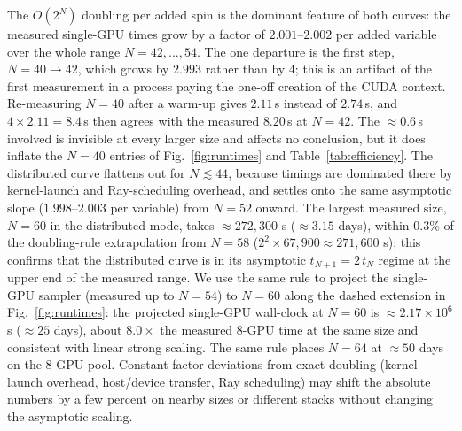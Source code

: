 \documentclass[12pt,a4paper]{elsarticle}
\begin{document}
The $O(2^N)$ doubling per added spin is the dominant feature of both curves: the
measured single-GPU times grow by a factor of $2.001$--$2.002$ per added variable
over the whole range $N=42,\dots,54$. The one departure is the first step,
$N=40\to42$, which grows by $2.993$ rather than by $4$; this is an artifact of the
first measurement in a process paying the one-off creation of the CUDA context.
Re-measuring $N=40$ after a warm-up gives $2.11$\,s instead of $2.74$\,s, and
$4\times 2.11=8.4$\,s then agrees with the measured $8.20$\,s at $N=42$. The
$\approx\!0.6$\,s involved is invisible at every larger size and affects no
conclusion, but it does inflate the $N=40$ entries of Fig.~\ref{fig:runtimes} and
Table~\ref{tab:efficiency}. The distributed curve flattens out for $N \lesssim 44$,
because timings are dominated there by kernel-launch and Ray-scheduling overhead,
and settles onto the same asymptotic slope ($1.998$--$2.003$ per variable) from
$N=52$ onward. The largest measured size, $N=60$ in the distributed mode, takes
$\approx\!272{,}300$ s ($\approx 3.15$ days), within $0.3\%$ of the
doubling-rule extrapolation from $N=58$ ($2^{2}\!\times\!67{,}900 \approx
271{,}600$ s); this confirms that the distributed curve is in its asymptotic
$t_{N+1}=2\,t_N$ regime at the upper end of the measured range. We use the same rule to project
the single-GPU sampler (measured
up to $N=54$) to $N=60$ along the dashed extension in Fig.~\ref{fig:runtimes}:
the projected single-GPU wall-clock at $N=60$ is $\approx\!2.17\times 10^{6}$ s
($\approx\!25$ days), about $8.0\times$ the measured 8-GPU time at the same size
and consistent with linear strong scaling. The same rule places $N=64$ at
$\approx\!50$ days on the 8-GPU pool. Constant-factor deviations from exact
doubling (kernel-launch overhead, host/device transfer, Ray scheduling) may shift
the absolute numbers by a few percent on nearby sizes or different stacks without changing the
asymptotic scaling.
\end{document}
